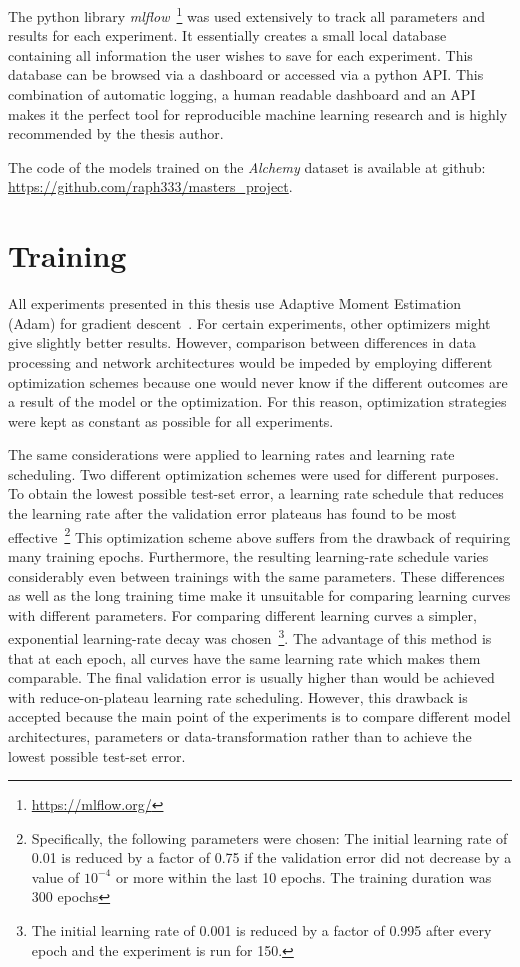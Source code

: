 The python library \textit{mlflow}~\footnote{\url{https://mlflow.org/}} was used extensively to track all parameters and results for each experiment. It essentially creates a small local database containing all information the user wishes to save for each experiment. This database can be browsed via a dashboard or accessed via a python API. This combination of automatic logging, a human readable dashboard and an API makes it the perfect tool for reproducible machine learning research and is highly recommended by the thesis author.

The code of the models trained on the \textit{Alchemy} dataset is available at github: \url{https://github.com/raph333/masters\_project}.



\section{Training}
\label{sec:training}

All experiments presented in this thesis use Adaptive Moment Estimation (Adam) for gradient descent~\cite{Kingma2015}. For certain experiments, other optimizers might give slightly better results. However, comparison between differences in data processing and network architectures would be impeded by employing different optimization schemes because one would never know if the different outcomes are a result of the model or the optimization. For this reason, optimization strategies were kept as constant as possible for all experiments.

The same considerations were applied to learning rates and learning rate scheduling. Two different optimization schemes were used for different purposes.
To obtain the lowest possible test-set error, a learning rate schedule that reduces the learning rate after the validation error plateaus has found to be most effective~\footnote{Specifically, the following parameters were chosen: The initial learning rate of 0.01 is reduced by a factor of 0.75 if the validation error did not decrease by a value of $10^{-4}$ or more within the last 10 epochs. The training duration was 300 epochs} This optimization scheme above suffers from the drawback of requiring many training epochs. Furthermore, the resulting learning-rate schedule varies considerably even between trainings with the same parameters. These differences as well as the long training time make it unsuitable for comparing learning curves with different parameters.
For comparing different learning curves a simpler, exponential learning-rate decay was chosen~\footnote{The initial learning rate of 0.001 is reduced by a factor of 0.995 after every epoch and the experiment is run for 150.}. The advantage of this method is that at each epoch, all curves have the same learning rate which makes them comparable. The final validation error is usually higher than would be achieved with reduce-on-plateau learning rate scheduling. However, this drawback is accepted because the main point of the experiments is to compare different model architectures, parameters or data-transformation rather than to achieve the lowest possible test-set error.

